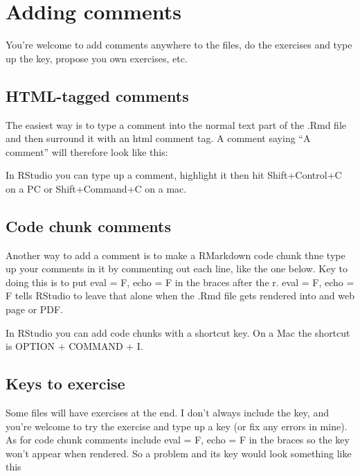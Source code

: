 \documentclass[
]{book}
\begin{document}
\hypertarget{adding-comments}{%
\section{Adding comments}\label{adding-comments}}

You're welcome to add comments anywhere to the files, do the exercises and type up the key, propose you own exercises, etc.

\hypertarget{html-tagged-comments}{%
\subsection{HTML-tagged comments}\label{html-tagged-comments}}

The easiest way is to type a comment into the normal text part of the .Rmd file and then surround it with an html comment tag. A comment saying ``A comment'' will therefore look like this:

In RStudio you can type up a comment, highlight it then hit Shift+Control+C on a PC or Shift+Command+C on a mac.

\hypertarget{code-chunk-comments}{%
\subsection{Code chunk comments}\label{code-chunk-comments}}

Another way to add a comment is to make a RMarkdown code chunk thne type up your comments in it by commenting out each line, like the one below. Key to doing this is to put eval = F, echo = F in the braces after the r. eval = F, echo = F tells RStudio to leave that alone when the .Rmd file gets rendered into and web page or PDF.

In RStudio you can add code chunks with a shortcut key. On a Mac the shortcut is OPTION + COMMAND + I.

\hypertarget{keys-to-exercise}{%
\subsection{Keys to exercise}\label{keys-to-exercise}}

Some files will have exercises at the end. I don't always include the key, and you're welcome to try the exercise and type up a key (or fix any errors in mine). As for code chunk comments include eval = F, echo = F in the braces so the key won't appear when rendered. So a problem and its key would look something like this
\end{document}
